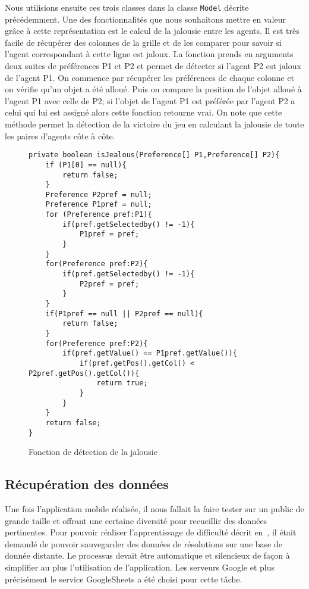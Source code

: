 \documentclass[../main.tex]{subfiles}
\begin{document}
Nous utilisions ensuite ces trois classes dans la classe \texttt{Model} décrite précédemment. Une des fonctionnalités que nous souhaitons mettre en valeur grâce à cette représentation est le calcul de la jalousie entre les agents. Il est très facile de récupérer des colonnes de la grille et de les comparer pour savoir si l'agent correspondant à cette ligne est jaloux. La fonction prends en arguments deux suites de préférences \textsf{P1} et \textsf{P2} et permet de détecter si l'agent \textsf{P2} est jaloux de l'agent \textsf{P1}. On commence par récupérer les préférences de chaque colonne et on vérifie qu'un objet a été alloué. Puis on compare la position de l'objet alloué à l'agent \textsf{P1} avec celle de \textsf{P2}; si l'objet de l'agent \textsf{P1} est préférée par l'agent \textsf{P2} a celui qui lui est assigné alors cette fonction retourne vrai. On note que cette méthode permet la détection de la victoire du jeu en calculant la jalousie de toute les paires d'agents côte à côte.

\begin{figure}[ht!]
\begin{lstlisting}
private boolean isJealous(Preference[] P1,Preference[] P2){
    if (P1[0] == null){
        return false;
    }
    Preference P2pref = null;
    Preference P1pref = null;
    for (Preference pref:P1){
        if(pref.getSelectedby() != -1){
            P1pref = pref;
        }
    }
    for(Preference pref:P2){
        if(pref.getSelectedby() != -1){
            P2pref = pref;
        }
    }
    if(P1pref == null || P2pref == null){
        return false;
    }
    for(Preference pref:P2){
        if(pref.getValue() == P1pref.getValue()){
            if(pref.getPos().getCol() < P2pref.getPos().getCol()){
                return true;
            }
        }
    }
    return false;
}
\end{lstlisting}
\caption{Fonction de détection de la jalousie}
\label{detection-jalousie}
\end{figure}

	\subsection{Récupération des données}
	
	Une fois l'application mobile réalisée, il nous fallait la faire tester sur un public de grande taille et offrant une certaine diversité pour recueillir des données pertinentes. Pour pouvoir réaliser l'apprentissage de difficulté décrit en~, il était demandé de pouvoir sauvegarder des données de résolutions sur une base de donnée distante. Le processus devait être automatique et silencieux de façon à simplifier au plus l'utilisation de l'application. Les serveurs Google et plus précisément le service GoogleSheets a été choisi pour cette tâche. 
\end{document}
